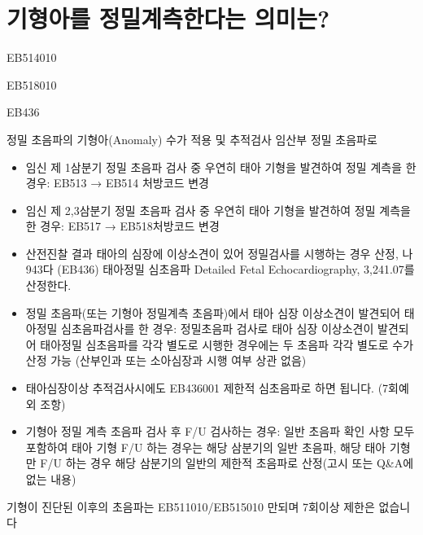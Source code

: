 \section{기형아를 정밀계측한다는 의미는?}
\Large EB514010 \normalsize {}\par
\noindent\Large EB518010 \normalsize {}\par
\noindent\Large EB436 \normalsize {}
\prezi{\clearpage}
\begin{commentbox}{정밀 초음파의 기형아(Anomaly) 수가 적용 및 추적검사}%
임산부 정밀 초음파로 
\begin{itemize}\tightlist
	\item 임신 제 1삼분기 정밀 초음파 검사 중 우연히 태아 기형을 발견하여 정밀 계측을 한 경우: EB513 → EB514 처방코드 변경
	\item 임신 제 2,3삼분기 정밀 초음파 검사 중 우연히 태아 기형을 발견하여 정밀 계측을 한 경우: EB517 → EB518처방코드 변경
	\item 산전진찰 결과 태아의 심장에 이상소견이 있어 정밀검사를 시행하는 경우 산정, 나943다 (EB436) 태아정밀 심초음파 Detailed Fetal Echocardiography, 3,241.07를 산정한다.
	\item 정밀 초음파(또는 기형아 정밀계측 초음파)에서 태아 심장 이상소견이 발견되어 태아정밀 심초음파검사를 한 경우: 정밀초음파 검사로 태아 심장 이상소견이 발견되어 태아정밀 심초음파를 각각 별도로 시행한 경우에는 두 초음파 각각 별도로 수가 산정 가능 (산부인과 또는 소아심장과 시행 여부 상관 없음) 
	\item 태아심장이상 추적검사시에도 EB436001 제한적 심초음파로 하면 됩니다. (7회예외 조항)
	\item 기형아 정밀 계측 초음파 검사 후 F/U 검사하는 경우: 일반 초음파 확인 사항 모두 포함하여 태아 기형 F/U 하는 경우는 해당 삼분기의 일반 초음파, 해당 태아 기형만 F/U 하는 경우 해당 삼분기의 일반의 제한적 초음파로 산정(고시 또는 \textsf{Q\&A}에 없는 내용)
\end{itemize}
\end{commentbox}
\prezi{\clearpage}
\begin{commentbox}{}
기형이 진단된 이후의 초음파는 EB511010/EB515010 만되며 7회이상 제한은 없습니다
\end{commentbox}
\prezi{\clearpage}

